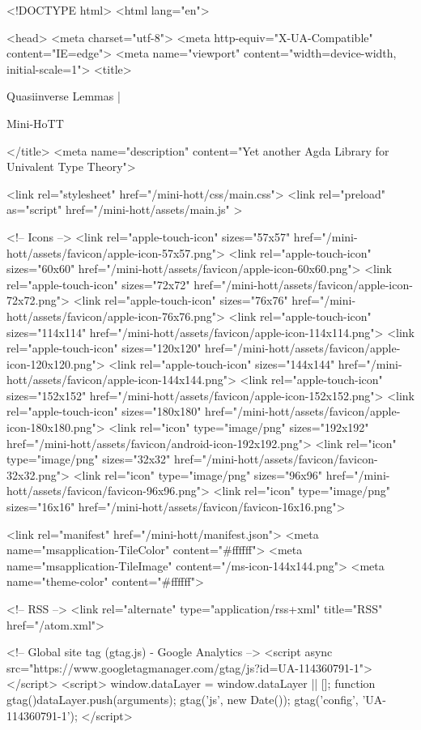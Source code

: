 <!DOCTYPE html>
<html lang="en">

<head>
  <meta charset="utf-8">
  <meta http-equiv="X-UA-Compatible" content="IE=edge">
  <meta name="viewport" content="width=device-width, initial-scale=1">
  <title>
    
      
        Quasiinverse Lemmas |
      
        Mini-HoTT
    
  </title>
  <meta name="description" content="Yet another Agda Library for Univalent Type Theory">

  <link rel="stylesheet" href="/mini-hott/css/main.css">
  <link rel="preload" as="script" href="/mini-hott/assets/main.js" >

  <!-- Icons -->
  <link rel="apple-touch-icon" sizes="57x57" href="/mini-hott/assets/favicon/apple-icon-57x57.png">
  <link rel="apple-touch-icon" sizes="60x60" href="/mini-hott/assets/favicon/apple-icon-60x60.png">
  <link rel="apple-touch-icon" sizes="72x72" href="/mini-hott/assets/favicon/apple-icon-72x72.png">
  <link rel="apple-touch-icon" sizes="76x76" href="/mini-hott/assets/favicon/apple-icon-76x76.png">
  <link rel="apple-touch-icon" sizes="114x114" href="/mini-hott/assets/favicon/apple-icon-114x114.png">
  <link rel="apple-touch-icon" sizes="120x120" href="/mini-hott/assets/favicon/apple-icon-120x120.png">
  <link rel="apple-touch-icon" sizes="144x144" href="/mini-hott/assets/favicon/apple-icon-144x144.png">
  <link rel="apple-touch-icon" sizes="152x152" href="/mini-hott/assets/favicon/apple-icon-152x152.png">
  <link rel="apple-touch-icon" sizes="180x180" href="/mini-hott/assets/favicon/apple-icon-180x180.png">
  <link rel="icon" type="image/png" sizes="192x192"  href="/mini-hott/assets/favicon/android-icon-192x192.png">
  <link rel="icon" type="image/png" sizes="32x32" href="/mini-hott/assets/favicon/favicon-32x32.png">
  <link rel="icon" type="image/png" sizes="96x96" href="/mini-hott/assets/favicon/favicon-96x96.png">
  <link rel="icon" type="image/png" sizes="16x16" href="/mini-hott/assets/favicon/favicon-16x16.png">

  <link rel="manifest" href="/mini-hott/manifest.json">
  <meta name="msapplication-TileColor" content="#ffffff">
  <meta name="msapplication-TileImage" content="/ms-icon-144x144.png">
  <meta name="theme-color" content="#ffffff">

  <!-- RSS -->
  <link rel="alternate" type="application/rss+xml" title="RSS" href="/atom.xml">

  <!-- Global site tag (gtag.js) - Google Analytics -->
  <script async src="https://www.googletagmanager.com/gtag/js?id=UA-114360791-1"></script>
  <script>
    window.dataLayer = window.dataLayer || [];
    function gtag(){dataLayer.push(arguments);}
    gtag('js', new Date());
    gtag('config', 'UA-114360791-1');
  </script>

